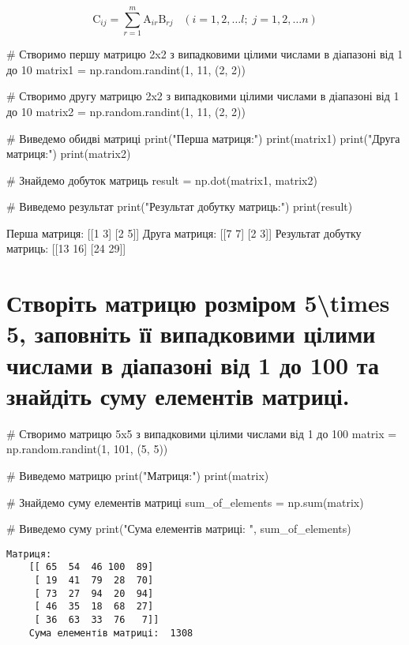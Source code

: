 \documentclass[]{article}
\newcounter{pythoncode}
\begin{document}
\[\mathrm C_{ij} = \sum_{r=1}^m \mathrm A_{ir} \mathrm B_{rj} \;\;\; \left(i=1, 2, \ldots l;\; j=1, 2, \ldots n \right)\]

\begin{pythoncode}
    # Створимо першу матрицю 2x2 з випадковими цілими числами в діапазоні від 1 до 10
    matrix1 = np.random.randint(1, 11, (2, 2))

    # Створимо другу матрицю 2x2 з випадковими цілими числами в діапазоні від 1 до 10
    matrix2 = np.random.randint(1, 11, (2, 2))

    # Виведемо обидві матриці
    print("Перша матриця:")
    print(matrix1)
    print("Друга матриця:")
    print(matrix2)

    # Знайдемо добуток матриць
    result = np.dot(matrix1, matrix2)

    # Виведемо результат
    print("Результат добутку матриць:")
    print(result)
\end{pythoncode}

\begin{out}
	Перша матриця:
	[[1 3]
	 [2 5]]
	Друга матриця:
	[[7 7]
	 [2 3]]
	Результат добутку матриць:
	[[13 16]
	 [24 29]]
\end{out}

\section{Створіть матрицю розміром 5\textbackslash times 5, заповніть її випадковими цілими числами в діапазоні від 1 до 100 та знайдіть суму елементів матриці.}

\begin{pythoncode}
    # Створимо матрицю 5x5 з випадковими цілими числами від 1 до 100
    matrix = np.random.randint(1, 101, (5, 5))

    # Виведемо матрицю
    print("Матриця:")
    print(matrix)

    # Знайдемо суму елементів матриці
    sum_of_elements = np.sum(matrix)

    # Виведемо суму
    print("Сума елементів матриці: ", sum_of_elements)
\end{pythoncode}

\begin{Verbatim}[commandchars=\\\{\}]
	Матриця:
	[[ 65  54  46 100  89]
	 [ 19  41  79  28  70]
	 [ 73  27  94  20  94]
	 [ 46  35  18  68  27]
	 [ 36  63  33  76   7]]
	Сума елементів матриці:  1308
\end{Verbatim}
\end{document}
